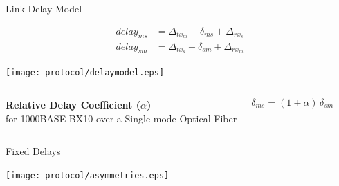 \documentclass[compress,red]{beamer}
\begin{document}
\begin{frame}{Link Delay Model}

  \begin{align}
    \nonumber delay_{ms} &= \Delta_{tx_m} + \delta_{ms} + \Delta_{rx_s} \\
    \nonumber delay_{sm} &= \Delta_{tx_s} + \delta_{sm} + \Delta_{rx_m}
  \end{align}

   \vspace{0.2cm}

  \begin{center}
  \texttt{[image: protocol/delaymodel.eps]}
  \end{center}

\begin{columns}[c]
  \column{2.8in}

    \begin{center}
      \textbf{Relative Delay Coefficient ($\alpha$)} \\
      for 1000BASE-BX10 over a Single-mode Optical Fiber
    \end{center}

  \column{1.5in}
    \begin{center}
      \begin{equation}
      \nonumber \delta_{ms} = (1 + \alpha) \, \delta_{sm}
      \end{equation}
    \end{center}
    \vspace{0.5cm}
\end{columns}
  
\end{frame}

\begin{frame}{Fixed Delays}

  \begin{center}
  \texttt{[image: protocol/asymmetries.eps]}
  \end{center}

\end{frame}
\end{document}
